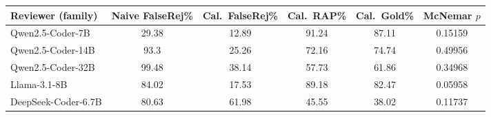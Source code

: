 \begin{tabular}{lccccc}
\toprule
Reviewer (family) & Naive FalseRej\% & Cal.\ FalseRej\% & Cal.\ RAP\% & Cal.\ Gold\% & McNemar $p$ \\
\midrule
Qwen2.5-Coder-7B & 29.38 & 12.89 & 91.24 & 87.11 & 0.15159 \\
Qwen2.5-Coder-14B & 93.3 & 25.26 & 72.16 & 74.74 & 0.49956 \\
Qwen2.5-Coder-32B & 99.48 & 38.14 & 57.73 & 61.86 & 0.34968 \\
Llama-3.1-8B & 84.02 & 17.53 & 89.18 & 82.47 & 0.05958 \\
DeepSeek-Coder-6.7B & 80.63 & 61.98 & 45.55 & 38.02 & 0.11737 \\
\bottomrule
\end{tabular}
